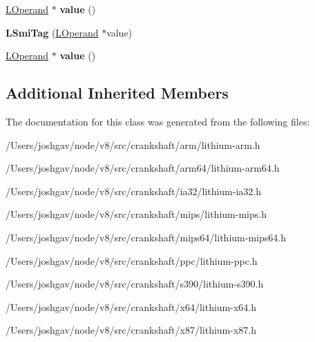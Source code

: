 \begin{DoxyCompactItemize}
\item 
\hyperlink{classv8_1_1internal_1_1_l_operand}{L\+Operand} $\ast$ {\bfseries value} ()\hypertarget{classv8_1_1internal_1_1_l_smi_tag_ad76b3e5fc445a86e476136eedc38532a}{}\label{classv8_1_1internal_1_1_l_smi_tag_ad76b3e5fc445a86e476136eedc38532a}

\item 
{\bfseries L\+Smi\+Tag} (\hyperlink{classv8_1_1internal_1_1_l_operand}{L\+Operand} $\ast$value)\hypertarget{classv8_1_1internal_1_1_l_smi_tag_a07eab9d116e1b39d969b918d4e98b7eb}{}\label{classv8_1_1internal_1_1_l_smi_tag_a07eab9d116e1b39d969b918d4e98b7eb}

\item 
\hyperlink{classv8_1_1internal_1_1_l_operand}{L\+Operand} $\ast$ {\bfseries value} ()\hypertarget{classv8_1_1internal_1_1_l_smi_tag_ad76b3e5fc445a86e476136eedc38532a}{}\label{classv8_1_1internal_1_1_l_smi_tag_ad76b3e5fc445a86e476136eedc38532a}

\end{DoxyCompactItemize}
\subsection*{Additional Inherited Members}


The documentation for this class was generated from the following files\+:\begin{DoxyCompactItemize}
\item 
/\+Users/joshgav/node/v8/src/crankshaft/arm/lithium-\/arm.\+h\item 
/\+Users/joshgav/node/v8/src/crankshaft/arm64/lithium-\/arm64.\+h\item 
/\+Users/joshgav/node/v8/src/crankshaft/ia32/lithium-\/ia32.\+h\item 
/\+Users/joshgav/node/v8/src/crankshaft/mips/lithium-\/mips.\+h\item 
/\+Users/joshgav/node/v8/src/crankshaft/mips64/lithium-\/mips64.\+h\item 
/\+Users/joshgav/node/v8/src/crankshaft/ppc/lithium-\/ppc.\+h\item 
/\+Users/joshgav/node/v8/src/crankshaft/s390/lithium-\/s390.\+h\item 
/\+Users/joshgav/node/v8/src/crankshaft/x64/lithium-\/x64.\+h\item 
/\+Users/joshgav/node/v8/src/crankshaft/x87/lithium-\/x87.\+h\end{DoxyCompactItemize}
